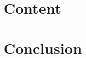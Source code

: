 \documentclass[handout]{beamer}
\begin{document}
\section{Content}
%    
%    
%    
%    
\section{Conclusion}
\begin{frame}
\end{frame}
\end{document}
